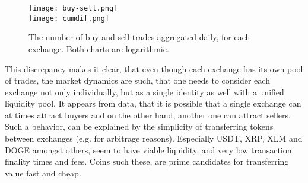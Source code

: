 \begin{figure}[H]
	\centering
    \texttt{[image: buy-sell.png]} \\
    \texttt{[image: cumdif.png]} \\ 
	\caption{The number of buy and sell trades aggregated daily, for each exchange. Both charts are logarithmic.}
    \label{fig:cum}
\end{figure}


This discrepancy makes it clear, that even though each exchange has its own pool of
trades, the market dynamics are such, that one needs to consider each exchange not
only individually, but as a single identity as well with a unified liquidity pool. It appears from data, that it is possible that a single exchange can at times attract buyers and on the other hand, another one can attract sellers.
Such a behavior, can be explained by the simplicity of 
transferring tokens between exchanges (e.g. for arbitrage reasons). Especially USDT, XRP,
XLM and DOGE amongst others, seem to have viable liquidity, and very low
transaction finality times and fees. Coins such these, are prime candidates for transferring value fast and cheap.